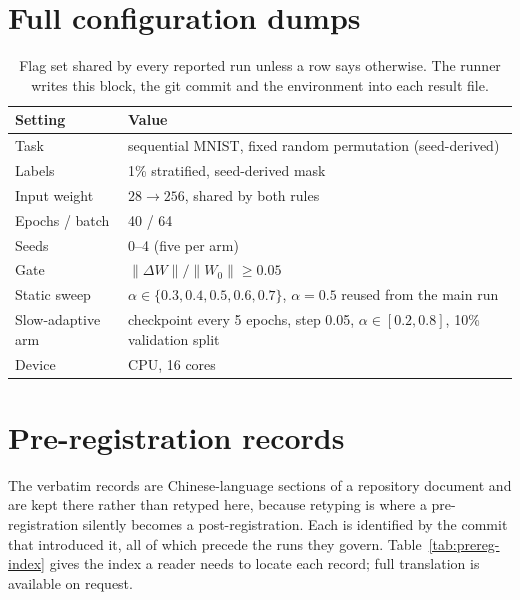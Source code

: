 \documentclass[11pt]{article}
\begin{document}
\appendix

\section{Full configuration dumps}\label{app:config}

\begin{table}[h]
\centering
\caption{Flag set shared by every reported run unless a row says otherwise. The runner writes
this block, the git commit and the environment into each result file.}
\begin{tabular}{ll}
\toprule
Setting & Value \\
\midrule
Task & sequential MNIST, fixed random permutation (seed-derived) \\
Labels & 1\% stratified, seed-derived mask \\
Input weight & $28 \to 256$, shared by both rules \\
Epochs / batch & 40 / 64 \\
Seeds & 0--4 (five per arm) \\
Gate & $\|\Delta W\|/\|W_0\| \ge 0.05$ \\
Static sweep & $\alpha \in \{0.3, 0.4, 0.5, 0.6, 0.7\}$, $\alpha = 0.5$ reused from the main run \\
Slow-adaptive arm & checkpoint every 5 epochs, step 0.05, $\alpha \in [0.2, 0.8]$, 10\% validation split \\
Device & CPU, 16 cores \\
\bottomrule
\end{tabular}
\end{table}

\section{Pre-registration records}\label{app:prereg}

The verbatim records are Chinese-language sections of a repository document and are kept there
rather than retyped here, because retyping is where a pre-registration silently becomes a
post-registration. Each is identified by the commit that introduced it, all of which precede the
runs they govern. Table~\ref{tab:prereg-index} gives the index a reader needs to locate each
record; full translation is available on request.
\end{document}
